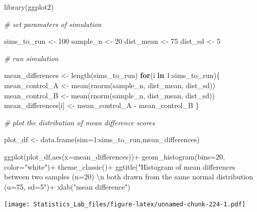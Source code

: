 \documentclass[
]{book}
\newenvironment{Shaded}{\begin{snugshade}}{\end{snugshade}}
\newcommand{\AttributeTok}[1]{\textcolor[rgb]{0.77,0.63,0.00}{#1}}
\newcommand{\CommentTok}[1]{\textcolor[rgb]{0.56,0.35,0.01}{\textit{#1}}}
\newcommand{\ControlFlowTok}[1]{\textcolor[rgb]{0.13,0.29,0.53}{\textbf{#1}}}
\newcommand{\DecValTok}[1]{\textcolor[rgb]{0.00,0.00,0.81}{#1}}
\newcommand{\FunctionTok}[1]{\textcolor[rgb]{0.00,0.00,0.00}{#1}}
\newcommand{\NormalTok}[1]{#1}
\newcommand{\OtherTok}[1]{\textcolor[rgb]{0.56,0.35,0.01}{#1}}
\newcommand{\SpecialCharTok}[1]{\textcolor[rgb]{0.00,0.00,0.00}{#1}}
\newcommand{\StringTok}[1]{\textcolor[rgb]{0.31,0.60,0.02}{#1}}
\begin{document}
\begin{Shaded}
\begin{Highlighting}[]
\FunctionTok{library}\NormalTok{(ggplot2)}

\CommentTok{\# set paramaters of simulation}

\NormalTok{sims\_to\_run }\OtherTok{\textless{}{-}} \DecValTok{100}
\NormalTok{sample\_n   }\OtherTok{\textless{}{-}} \DecValTok{20}
\NormalTok{dist\_mean  }\OtherTok{\textless{}{-}} \DecValTok{75}
\NormalTok{dist\_sd    }\OtherTok{\textless{}{-}} \DecValTok{5}

\CommentTok{\# run simulation}

\NormalTok{mean\_differences }\OtherTok{\textless{}{-}} \FunctionTok{length}\NormalTok{(sims\_to\_run)}
\ControlFlowTok{for}\NormalTok{(i }\ControlFlowTok{in} \DecValTok{1}\SpecialCharTok{:}\NormalTok{sims\_to\_run)\{}
\NormalTok{  mean\_control\_A      }\OtherTok{\textless{}{-}} \FunctionTok{mean}\NormalTok{(}\FunctionTok{rnorm}\NormalTok{(sample\_n, dist\_mean, dist\_sd))}
\NormalTok{  mean\_control\_B      }\OtherTok{\textless{}{-}} \FunctionTok{mean}\NormalTok{(}\FunctionTok{rnorm}\NormalTok{(sample\_n, dist\_mean, dist\_sd))}
\NormalTok{  mean\_differences[i] }\OtherTok{\textless{}{-}}\NormalTok{ mean\_control\_A }\SpecialCharTok{{-}}\NormalTok{ mean\_control\_B}
\NormalTok{\}}

\CommentTok{\# plot the  distribution of mean difference scores}

\NormalTok{plot\_df }\OtherTok{\textless{}{-}} \FunctionTok{data.frame}\NormalTok{(}\AttributeTok{sim=}\DecValTok{1}\SpecialCharTok{:}\NormalTok{sims\_to\_run,mean\_differences)}

\FunctionTok{ggplot}\NormalTok{(plot\_df,}\FunctionTok{aes}\NormalTok{(}\AttributeTok{x=}\NormalTok{mean\_differences))}\SpecialCharTok{+}
  \FunctionTok{geom\_histogram}\NormalTok{(}\AttributeTok{bins=}\DecValTok{20}\NormalTok{, }\AttributeTok{color=}\StringTok{"white"}\NormalTok{)}\SpecialCharTok{+}
  \FunctionTok{theme\_classic}\NormalTok{()}\SpecialCharTok{+}
  \FunctionTok{ggtitle}\NormalTok{(}\StringTok{"Histogram of mean differences between two samples (n=20) }\SpecialCharTok{\textbackslash{}n}
\StringTok{          both drawn from the same normal distribution (u=75, sd=5"}\NormalTok{)}\SpecialCharTok{+}
  \FunctionTok{xlab}\NormalTok{(}\StringTok{"mean difference"}\NormalTok{)}
\end{Highlighting}
\end{Shaded}

\texttt{[image: Statistics\_Lab\_files/figure-latex/unnamed-chunk-224-1.pdf]}
\end{document}
